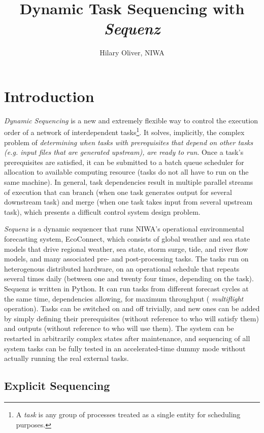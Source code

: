 \documentclass[11pt,a4paper]{report}
\title{Dynamic Task Sequencing with {\em Sequenz}}
\author{Hilary Oliver, NIWA}
\begin{document}
\maketitle
\tableofcontents


\chapter{Introduction}

{\em Dynamic Sequencing} is a new and extremely flexible way to control
the execution order of a network of interdependent tasks\footnote{A {\em
task} is any group of processes treated as a single entity for
scheduling purposes.}. It solves, implicitly, the complex problem of
{\em determining when tasks with prerequisites that depend on other
tasks (e.g. input files that are generated upstream), are ready to run}.
Once a task's prerequisites are satisfied, it can be submitted to a
batch queue scheduler for allocation to available computing resource
(tasks do not all have to run on the same machine).  In general, task
dependencies result in multiple parallel streams of execution that can
branch (when one task generates output for several downstream task) and
merge (when one task takes input from several upstream task), which
presents a difficult control system design problem.  

{\em Sequenz} is a dynamic sequencer that runs NIWA's operational
environmental forecasting system, EcoConnect, which consists of global
weather and sea state models that drive regional weather, sea state,
storm surge, tide, and river flow models, and many associated pre- and
post-processing tasks. The tasks run on heterogenous distributed
hardware, on an operational schedule that repeats several times daily
(between one and twenty four times, depending on the task). Sequenz is
written in Python. It can run tasks from different forecast cycles at
the same time, dependencies allowing, for maximum throughput ({\em
multiflight} operation). Tasks can be switched on and off trivially, and
new ones can be added by simply defining their prerequisites (without
reference to who will satisfy them) and outputs (without reference to
who will use them). The system can be restarted in arbitrarily complex
states after maintenance, and sequencing of all system tasks can be
fully tested in an accelerated-time dummy mode without actually running
the real external tasks. 

\section{Explicit Sequencing}
\end{document}
